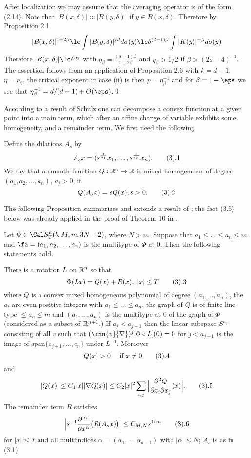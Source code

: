  After localization we may assume that the 
averaging operator is of the form (2.14).
Note that $|B(x,\delta)|\approx |B(y,\delta)|$ if
$y\in B(x,\delta)$.
Therefore by Proposition 2.1
$$
|B(x,\delta)|^{1+2\beta}\lc 
\int |B(y,\delta)|^{2\beta} d\sigma(y)
\lc \delta^{(d-1)\beta}
\int |K(y)|^{-\beta} d\sigma(y)
$$
Therefore 
$|B(x,\delta)|\lc\delta^{\eta_\beta}$ with $\eta_\beta=
\frac{(d-1)\beta}{1+2\beta}$
and $\eta_\beta>1/2$ if $\beta>(2d-4)^{-1}$.
The assertion follows from an application of  Proposition 2.6 with $k=d-1$,
$\eta=\eta_\beta$, the critical exponent in case (ii) is then 
$p=\eta_\beta^{-1}$ and for $\beta=1-\eps$ we see that
$\eta_\beta^{-1}=d/(d-1) +O(\eps)$.\qed
\enddemo






\endhead
According to a result of Schulz \cite{20} one can decompose  a convex function
at a given point into a main term, which after an affine change of variable
exhibits some  homogeneity, and a remainder term. We first need the
following


 Define the dilations $A_s$ by 
$$A_sx=(s^{\frac{1}{a_1}} x_1 , \ldots , s^{\frac{1}{a_{n}}} x_{n} ).
\tag 3.1$$
  We say that a smooth function $Q : {\Bbb R}^{n} 
\rightarrow {\Bbb R}$ is mixed homogeneous of degree $(a_1, a_2, \ldots
, a_{n})$, $a_j>0$, if
$$Q(A_sx)=
sQ(x), s > 0 .
\tag 3.2$$
\enddefinition

The following Proposition summarizes and  extends
a  result of  \cite{20}; the fact (3.5) below  was already  applied 
in the proof of Theorem 10 in \cite{14}.

  Let $\Phi\in \Cal S_T^n(b,M,m,3N+2)$, where $N>m$.
Suppose that $a_1\le \dots\le a_n\le m$ and 
$\fa=(a_1,a_2,\dots, a_n)$ is the multitype of $\Phi$ at $0$. 
Then the following statements hold.


There is a rotation $L$ on $\Bbb R^{n}$  so that
$$
\Phi(L x)=Q(x)+R(x), \ |x|\le T
\tag 3.3
$$
where $Q$ is a convex mixed homogeneous polynomial of degree 
$(a_1,\dots, a_n)$,   the  $a_i$ are even positive integers with
$a_1\le \dots\le a_{n}$, the graph of $Q$ is of finite line type 
$\le a_n\le  m$ 
and $(a_1,\dots, a_{n})$ is the multitype at $0$ of
 the graph of $\Phi$ (considered  as a subset of $\Bbb R^{n+1}$.)
If $a_j<a_{j+1}$ then the linear subspace $S^{a_j}$ 
 consisting of all
$v$ such that $(\inn{v}{\nabla})^j[\Phi\circ L](0)=0$ for $j< a_{j+1}$
 is  the image of $\text{span}\{e_{j+1},\dots, e_n\}$ under $L^{-1}$.
Moreover
$$Q(x)>0\quad \text{ if } x\neq 0\tag 3.4
$$
and
$$
|Q(x)|\le C_1|x||\nabla Q(x)|\le C_2|x|^2 \sum_{i,j}
\Big|\frac{\partial^2 Q}{\partial x_i \partial x_j  }(x)\Big|.
\tag 3.5
$$
The  remainder term $R$ satisfies
$$
\Big|s^{-1}\frac{\partial^{|\alpha |}}
{ \partial x^\alpha}\big(R(A_s x)\big) \Big| \le C_{M, N} s^{1/m}
\tag 3.6
$$
 for $|x|\le T$ and  all multiindices $\alpha=(\alpha_1,\dots, \alpha_{d-1})$ 
with $|\alpha|\le  N$; $A_s$ is as in  (3.1). 



